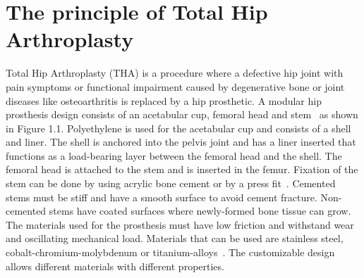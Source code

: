 \documentclass[whitelogo]{tudelft-report}
\begin{document}
{\section{The principle of Total Hip Arthroplasty}
Total Hip Arthroplasty (THA) is a procedure where a defective hip joint with pain symptoms or functional impairment caused by degenerative bone or joint diseases like osteoarthritis is replaced by a hip prosthetic. A modular hip prosthesis design consists of an acetabular cup, femoral head and stem~\cite{holzwarth2012total} as shown in Figure 1.1. Polyethylene is used for the acetabular cup and consists of a shell and liner. The shell is anchored into the pelvis joint and has a liner inserted that functions as a load-bearing layer between the femoral head and the shell. The femoral head is attached to the stem and is inserted in the femur. Fixation of the stem can be done by using acrylic bone cement or by a press fit~\cite{holzwarth2012total}. Cemented stems must be stiff and have a smooth surface to avoid cement fracture. Non-cemented stems have coated surfaces where newly-formed bone tissue can grow. The materials used for the prosthesis must have low friction and withstand wear and oscillating mechanical load. Materials that can be used are stainless steel, cobalt-chromium-molybdenum or titanium-alloys~\cite{holzwarth2012total}. The customizable design allows different materials with different properties.
\begin{figure}[ht]
	\centering
	\begin{subfigure}{0.31\linewidth}

\end{subfigure}
\end{figure}}
\end{document}
